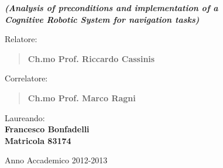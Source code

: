 \begin{titlepage}
\begin{center}

\vspace{0.5cm}

{\small \emph{\textbf{(Analysis of preconditions and implementation of a \\ Cognitive Robotic System for navigation tasks)}}} \\

\vspace{1.5cm}

\begin{flushleft}

{\normalsize Relatore:}
\begin{quote}
{\large \textbf{Ch.mo Prof. Riccardo Cassinis}} \\
\vspace{0.2cm}
\end{quote}

{\normalsize Correlatore:}
\begin{quote}
{\large \textbf{Ch.mo Prof. Marco Ragni}} \\
\vspace{0.2cm}
\end{quote}

\end{flushleft}


\begin{flushright}
Laureando: \\
\textbf{Francesco Bonfadelli} \\
\vspace{0.05cm}
\textbf{Matricola 83174} \\
\vspace{1.5cm}
\end{flushright}

\large{Anno Accademico 2012-2013}

\end{center}
\end{titlepage}